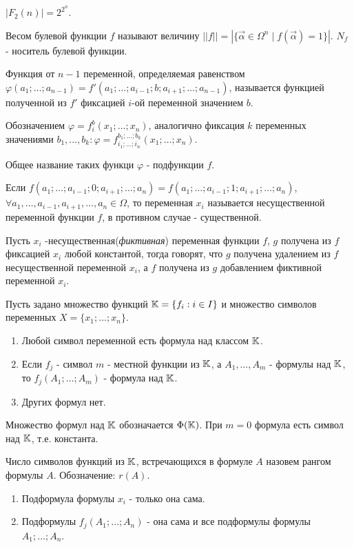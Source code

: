 \utv $|F_2(n)|= 2^{2^n}$.

\opr Весом булевой функции $f$ называют величину $||f|| = |\{\vec{\alpha} \in \Omega^n \mid f(\vec{\alpha}) = 1\}|$. $N_f$ - носитель булевой функции.

\opr Функция от $n-1$ переменной, определяемая равенством $\varphi(a_1; \dots; a_{n-1}) = f'(a_1; \dots; a_{i-1}; b; a_{i+1}; \dots; a_{n-1})$, называется
функцией полученной из $f'$ фиксацией $i$-ой переменной значением $b$.

Обозначением $\varphi = f_i^b(x_1; \dots; x_n)$, аналогично фиксация $k$ переменных значениями $b_1,\dots, b_k : \varphi = f_{i_1; \dots; i_n}^{b_1; \dots; b_k}(x_1; \dots; x_n)$.

Общее название таких функци $\varphi$ - подфункции $f$. 

Если $f(a_1; \dots; a_{i-1};0;a_{i+1}; \dots; a_n) = f(a_1; \dots; a_{i-1};1;a_{i+1}; \dots; a_n)$, $\forall a_1, \dots, a_{i-1}, a_{i+1}, \dots, a_n \in \Omega$, то 
переменная $x_i$ называется несущественной переменной функции $f$, в противном случае - существенной.

\opr Пусть $x_i$ -несущественная(\emph{фиктивная}) переменная функции $f$, $g$ получена из $f$ фиксацией $x_i$ любой константой, тогда говорят, что $g$
получена удалением из $f$ несущественной переменной $x_i$, а $f$ получена из $g$ добавлением фиктивной переменной $x_i$.

Пусть задано множество функций $\mathbb{K} = \{f_i : i \in I\}$ и множество символов переменных $X = \{x_1; \dots; x_n\}$.

\opr \begin{enumerate}
    \item Любой символ переменной есть формула над классом $\mathbb{K}$.
    \item Если $f_j$ - символ $m$ - местной функции из $\mathbb{K}$, а $A_1, \dots, A_m$ - формулы над $\mathbb{K}$, то $f_j(A_1; \dots; A_m)$ - формула над $\mathbb{K}$.
    \item Других формул нет.
\end{enumerate}

Множество формул над $\mathbb{K}$ обозначается $\Phi(\mathbb{K})$. При $m=0$ формула есть символ над $\mathbb{K}$, т.е. константа.

\opr Число символов функций из $\mathbb{K}$, встречающихся в формуле $A$ назовем рангом формулы $A$. Обозначение: $r(A)$.

\opr \begin{enumerate}
    \item Подформула формулы $x_i$ - только она сама.
    \item Подформулы $f_j(A_1; \dots; A_n)$ - она сама и все подформулы формулы $A_1; \dots; A_n$.
\end{enumerate}


